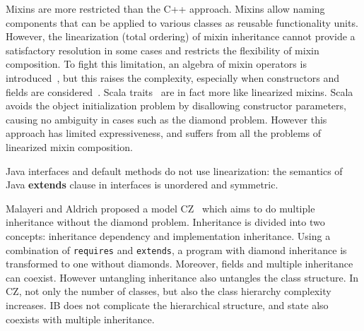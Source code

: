 Mixins are more restricted than the C++ approach. Mixins allow naming
components that can be applied to various classes as reusable functionality
units. However, %
the linearization (total ordering) of
mixin inheritance cannot provide a satisfactory resolution in some cases and
restricts the flexibility of mixin composition. To fight this limitation, an
algebra of mixin operators is introduced~\cite{ancona2002calculus}, but this
raises the complexity, especially when constructors and fields
are considered~\cite{marco09FJigsaw}. Scala traits~\cite{scala-overview} are in fact more like linearized mixins.
Scala avoids the object initialization
problem by disallowing constructor parameters, causing no ambiguity in cases
such as the diamond problem. However this approach has limited expressiveness, and
suffers from all the problems of linearized mixin composition. %
\begin{comment}
Python also offers multiple inheritance via linearized mixins. Indeed, in python any class is implicitly a mixin, and mixin composition informally expressed as\\*
\Q@ class A use B,C {...new methods...}@\\*
can be expressed in python as \\*
\Q@ class Aux: ...new methods...@\\*
\Q@ class A(B,C,Aux): pass@
\end{comment}
\noindent Java interfaces and default methods do not use
linearization: the semantics of Java \textbf{extends} clause in
interfaces is unordered and symmetric.


Malayeri and Aldrich proposed a model CZ~\cite{malayeri2009cz} which
aims to do multiple inheritance without the diamond problem. 
Inheritance is divided into two concepts: inheritance dependency
and implementation inheritance. Using a combination of
\texttt{requires} and \texttt{extends}, a program with diamond
inheritance is transformed to one without diamonds. Moreover,
fields and multiple inheritance can coexist. However untangling
inheritance also untangles the class structure. In CZ, not only the
number of classes, but also the class hierarchy complexity
increases. IB does not complicate the hierarchical structure, and state
also coexists with multiple inheritance.

